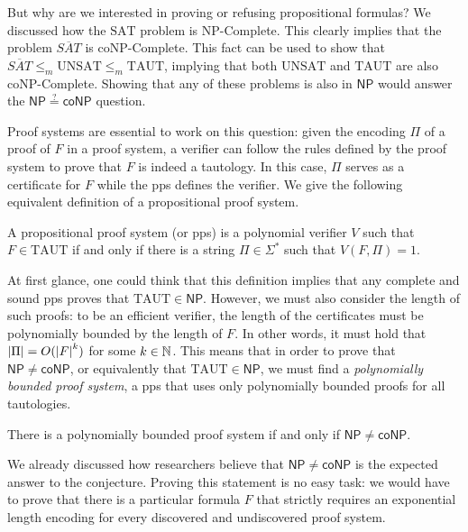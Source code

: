 But why are we interested in proving or refusing propositional formulas? We discussed how the $\mathrm{SAT}$ problem is \textsf{NP}-Complete. This clearly implies that the problem $\overline{SAT}$ is \textsf{coNP}-Complete. This fact can be used to show that $\overline{SAT} \leq_m \mathrm{UNSAT} \leq_m \mathrm{TAUT}$, implying that both $\mathrm{UNSAT}$ and $\mathrm{TAUT}$ are also \textsf{coNP}-Complete. Showing that any of these problems is also in $\mathsf{NP}$ would answer the $\mathsf{NP} \stackrel{?}{=} \mathsf{coNP}$ question.

Proof systems are essential to work on this question: given the encoding $\Pi$ of a proof of $F$ in a proof system, a verifier can follow the rules defined by the proof system to prove that $F$ is indeed a tautology. In this case, $\Pi$ serves as a certificate for $F$ while the pps defines the verifier. We give the following equivalent definition of a propositional proof system.

\newpage

\begin{definition}
 A propositional proof system (or pps) is a polynomial verifier $V$ such that $F \in \mathrm{TAUT}$ if and only if there is a string $\Pi \in \Sigma^*$ such that $V(F,\Pi) = 1$.
\end{definition}

At first glance, one could think that this definition implies that any complete and sound pps proves that $\mathrm{TAUT} \in \mathsf{NP}$. However, we must also consider the length of such proofs: to be an efficient verifier, the length of the certificates must be polynomially bounded by the length of $F$. In other words, it must hold that $\left|\Pi\right| = O(\left|F\right|^k)$ for some $k \in \mathbb{N}$. This means that in order to prove that $\mathsf{NP} \neq \mathsf{coNP}$, or equivalently that $\mathrm{TAUT} \in \mathsf{NP}$, we must find a \textit{polynomially bounded proof system}, a pps that uses only polynomially bounded proofs for all tautologies.

\begin{proposition}
 There is a polynomially bounded proof system if and only if $\mathsf{NP} \neq \mathsf{coNP}$.
\end{proposition}

We already discussed how researchers believe that $\mathsf{NP} \neq \mathsf{coNP}$ is the expected answer to the conjecture. Proving this statement is no easy task: we would have to prove that there is a particular formula $F$ that strictly requires an exponential length encoding for every discovered and undiscovered proof system.

